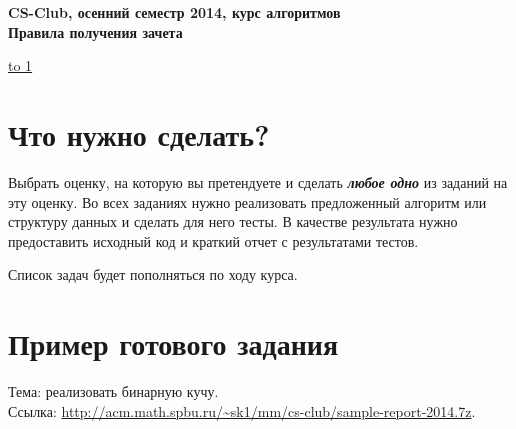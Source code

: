 \documentclass[12pt]{article}
\def\myindent{\hspace*{\parindent}}
\newcommand\Section[1]{\vspace*{-1em}\section{#1}}
\begin{document}
\begin{center}
  {\Large \bf CS-Club, осенний семестр 2014, курс алгоритмов} \\ 
  \vspace{0.5em}
  {\Large \bf Правила получения зачета} \\
\end{center}

\vspace{-1em}
\noindent \underline{\hbox to 1\textwidth{{ } \hfil{ } \hfil{ } }}

\Section{Что нужно сделать?}

\myindent{}Выбрать оценку, на которую вы претендуете и сделать {\bf\it любое одно} из заданий на эту оценку.
Во всех заданиях нужно реализовать предложенный алгоритм
или структуру данных и сделать для него тесты.
В качестве результата нужно предоставить
исходный код и краткий отчет с результатами тестов.

\vspace*{0.5em}
Список задач будет пополняться по ходу курса.

\Section{Пример готового задания}

Тема: реализовать бинарную кучу. \\
Ссылка: \url{http://acm.math.spbu.ru/~sk1/mm/cs-club/sample-report-2014.7z}.
              
\end{document}
